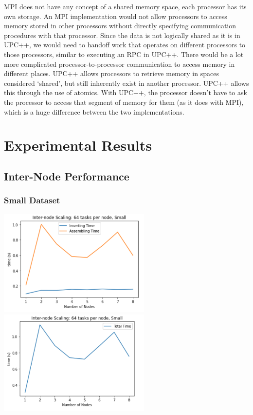 \documentclass{article}
\begin{document}
MPI does not have any concept of a shared memory space, each processor has its own storage. An MPI implementation would not allow processors to access memory stored in other processors without directly specifying communication procedures with that processor. Since the data is not logically shared as it is in UPC++, we would need to handoff work that operates on different processors to those processors, similar to executing an RPC in UPC++. There would be a lot more complicated processor-to-processor communication to access memory in different places. UPC++ allows processors to retrieve memory in spaces considered ‘shared’, but still inherently exist in another processor. UPC++ allows this through the use of atomics. With UPC++, the processor doesn’t have to ask the processor to access that segment of memory for them (as it does with MPI), which is a huge difference between the two implementations.

\section{Experimental Results}
\subsection{Inter-Node Performance}
\subsubsection{Small Dataset}
\centerline{\includegraphics[width=3in]{figures/inter-small-prof.png}\includegraphics[width=3in]{figures/inter-small.png}}
\end{document}
